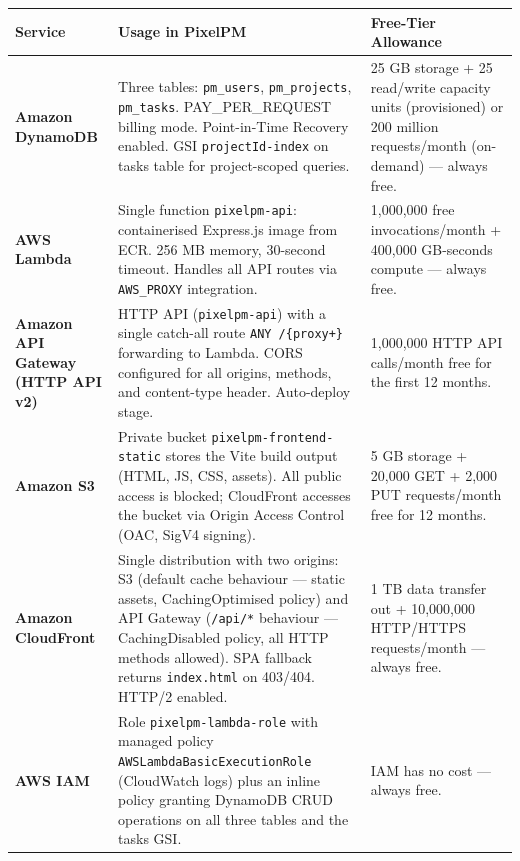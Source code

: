 \documentclass[12pt,a4paper]{report}
\begin{document}
\begin{longtable}{@{}p{3.2cm}p{5.4cm}p{5.6cm}@{}}
  \toprule
  \textbf{Service} & \textbf{Usage in PixelPM} & \textbf{Free-Tier Allowance} \\
  \midrule
  \endhead

  \textbf{Amazon DynamoDB} &
  Three tables: \texttt{pm\_users}, \texttt{pm\_projects}, \texttt{pm\_tasks}.
  PAY\_PER\_REQUEST billing mode. Point-in-Time Recovery enabled.
  GSI \texttt{projectId-index} on tasks table for project-scoped queries. &
  25 GB storage + 25 read/write capacity units (provisioned) or
  200 million requests/month (on-demand) — always free. \\

  \addlinespace[4pt]
  \textbf{AWS Lambda} &
  Single function \texttt{pixelpm-api}: containerised Express.js image from ECR.
  256 MB memory, 30-second timeout. Handles all API routes via
  \texttt{AWS\_PROXY} integration. &
  1,000,000 free invocations/month + 400,000 GB-seconds compute — always free. \\

  \addlinespace[4pt]
  \textbf{Amazon API Gateway (HTTP API v2)} &
  HTTP API (\texttt{pixelpm-api}) with a single catch-all route
  \texttt{ANY /\{proxy+\}} forwarding to Lambda. CORS configured for all
  origins, methods, and content-type header. Auto-deploy stage. &
  1,000,000 HTTP API calls/month free for the first 12 months. \\

  \addlinespace[4pt]
  \textbf{Amazon S3} &
  Private bucket \texttt{pixelpm-frontend-static} stores the Vite build output
  (HTML, JS, CSS, assets). All public access is blocked; CloudFront accesses
  the bucket via Origin Access Control (OAC, SigV4 signing). &
  5 GB storage + 20,000 GET + 2,000 PUT requests/month free for 12 months. \\

  \addlinespace[4pt]
  \textbf{Amazon CloudFront} &
  Single distribution with two origins: S3 (default cache behaviour — static
  assets, CachingOptimised policy) and API Gateway (\texttt{/api/*} behaviour —
  CachingDisabled policy, all HTTP methods allowed). SPA fallback returns
  \texttt{index.html} on 403/404. HTTP/2 enabled. &
  1 TB data transfer out + 10,000,000 HTTP/HTTPS requests/month — always free. \\

  \addlinespace[4pt]
  \textbf{AWS IAM} &
  Role \texttt{pixelpm-lambda-role} with managed policy
  \texttt{AWSLambdaBasicExecutionRole} (CloudWatch logs) plus an inline policy
  granting DynamoDB CRUD operations on all three tables and the tasks GSI. &
  IAM has no cost — always free. \\


\end{longtable}
\end{document}
